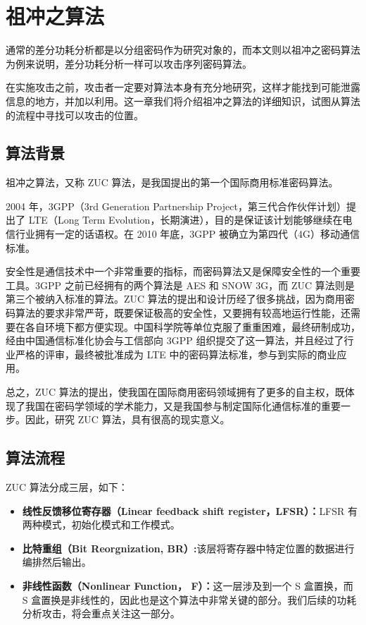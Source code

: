 
\chapter{祖冲之算法}
通常的差分功耗分析都是以分组密码作为研究对象的，而本文则以祖冲之密码算法为例来说明，差分功耗分析一样可以攻击序列密码算法。

在实施攻击之前，攻击者一定要对算法本身有充分地研究，这样才能找到可能泄露信息的地方，并加以利用。这一章我们将介绍祖冲之算法的详细知识，试图从算法的流程中寻找可以攻击的位置。

\section{算法背景} %
祖冲之算法，又称 ZUC 算法，是我国提出的第一个国际商用标准密码算法。

2004 年，3GPP（3rd Generation Partnership Project，第三代合作伙伴计划）提出了 LTE（Long Term Evolution，长期演进），目的是保证该计划能够继续在电信行业拥有一定的话语权。在 2010 年底，3GPP 被确立为第四代（4G）移动通信标准。

安全性是通信技术中一个非常重要的指标，而密码算法又是保障安全性的一个重要工具。3GPP 之前已经拥有的两个算法是 AES 和 SNOW 3G，而 ZUC 算法则是第三个被纳入标准的算法。ZUC 算法的提出和设计历经了很多挑战，因为商用密码算法的要求非常严苛，既要保证极高的安全性，又要拥有较高地运行性能，还需要在各自环境下都方便实现。中国科学院等单位克服了重重困难，最终研制成功，经由中国通信标准化协会与工信部向 3GPP 组织提交了这一算法，并且经过了行业严格的评审，最终被批准成为 LTE 中的密码算法标准，参与到实际的商业应用。

总之，ZUC 算法的提出，使我国在国际商用密码领域拥有了更多的自主权，既体现了我国在密码学领域的学术能力，又是我国参与制定国际化通信标准的重要一步。因此，研究 ZUC 算法，具有很高的现实意义。

\section{算法流程} %

ZUC 算法分成三层，如下：

\begin{itemize}
    \item \textbf{线性反馈移位寄存器（Linear feedback shift register，LFSR）：}LFSR 有两种模式，初始化模式和工作模式。
    \item \textbf{比特重组（Bit Reorgnization, BR）:}该层将寄存器中特定位置的数据进行编排然后输出。
    \item \textbf{非线性函数（Nonlinear Function， F）：}这一层涉及到一个 S 盒置换，而 S 盒置换是非线性的，因此也是这个算法中非常关键的部分。我们后续的功耗分析攻击，将会重点关注这一部分。
\end{itemize}

